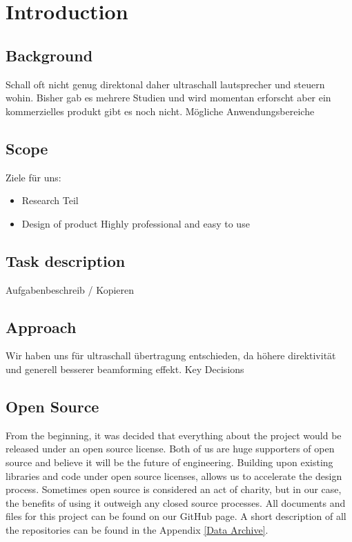 \newcommand{\package}{\emph}

\chapter{Introduction}
\section{Background}
Schall oft nicht genug direktonal daher ultraschall lautsprecher und steuern wohin. Bisher gab es mehrere Studien und wird momentan erforscht aber ein kommerzielles produkt gibt es noch nicht. Mögliche Anwendungsbereiche 
\section{Scope}
Ziele für uns:
\begin{itemize}
    \item Research Teil 
    \item Design of product
    Highly professional and easy to use
\end{itemize}
\section{Task description}
Aufgabenbeschreib / Kopieren
\section{Approach}
Wir haben uns für ultraschall übertragung entschieden, da höhere direktivität und generell besserer beamforming effekt. Key Decisions

\section{Open Source}
From the beginning, it was decided that everything about the project would be released under an open source license. Both of us are huge supporters of open source and believe it will be the future of engineering. Building upon existing libraries and code under open source licenses, allows us to accelerate the design process. Sometimes open source is considered an act of charity, but in our case, the benefits of using it outweigh any closed source processes. All documents and files for this project can be found on our GitHub page. A short description of all the repositories can be found in the Appendix \ref{Data Archive}.
